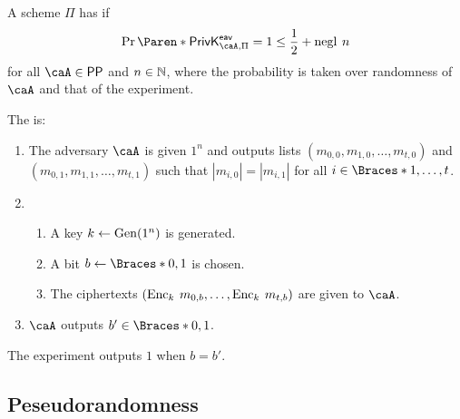 \documentclass[a5paper]{article}
\begin{document}
\begin{definition*}
	A scheme $\Pi$ has  if
  \begin{equation*}
    \Pr\paren{\mathsf{PrivK}^{\mathsf{eav}}_{\caA,\Pi}=1}\leq \frac 12 + \apply{\negl}{n}
  \end{equation*}
  for all $\caA\in\mathsf{PP}$ and $n\in\mathbb{N}$, where the probability is taken
  over randomness of $\caA$ and that of the experiment.
\end{definition*}

\begin{definition*}
  The  is:
  \begin{enumerate}%
    \itemsep0em
    \item The adversary $\caA$ is given $1^n$ and outputs lists
      $(m_{0,0},m_{1,0},\ldots,m_{t,0})$ and $(m_{0,1},m_{1,1},\ldots,m_{t,1})$
      such that $|m_{i,0}|=|m_{i,1}|$ for all $i\in\braces{1,\ldots,t}$.
    \item
      \begin{enumerate}%
        \itemsep0em
        \item A key $k\leftarrow\operatorname{Gen}(1^n)$ is generated.
        \item A bit $b\leftarrow \braces{0,1}$ is chosen.
        \item The ciphertexts $(\operatorname{Enc}_k\hspace{0.23em} m_{0,b},\ldots,\operatorname{Enc}_k\hspace{0.23em} m_{t,b})$
          are given to $\caA$.
      \end{enumerate}
    \item $\caA$ outputs $b'\in\braces{0,1}$.
  \end{enumerate}
  The experiment outputs $1$ when $b=b'$.
\end{definition*}

\subsection{Peseudorandomness}
\label{subsec:pseudorandomness}
\end{document}
